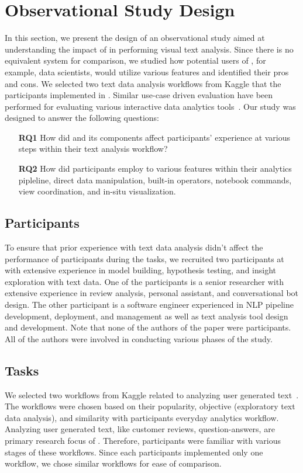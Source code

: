 \section{Observational Study Design}
\label{sec:study}
In this section, we present the design of an observational study
aimed at understanding the impact of \system in performing visual text analysis. 
Since there is no equivalent system for comparison, 
we studied how potential users of \system, for example, data scientists, would utilize various features and identified their pros and cons. 
We selected two text data analysis workflows 
from Kaggle that the participants implemented in
\system. Similar use-case driven evaluation have been performed for 
evaluating various interactive data analytics tools~\cite{fisher2012trust,moritz2017trust}. 
Our study was designed to answer the following questions:
\begin{itemize}
    \item[\textbf{RQ1}] How did \system and its components affect participants' experience at various steps within their text analysis workflow?
    \item[\textbf{RQ2}] How did participants employ to various \system features within their analytics pipleline, \eg direct data manipulation, built-in operators, notebook commands, view coordination, and in-situ visualization. 
\end{itemize}

\subsection{Participants}
\label{sec:participants}
To ensure that prior experience with text data analysis 
didn't affect the performance of participants during the tasks, 
we recruited two participants at \company with extensive experience in model building, hypothesis testing, and insight exploration with text data. One of the participants is a senior researcher with extensive experience in review analysis, personal assistant, and conversational bot design. The other participant is a software engineer
experienced in NLP pipeline development, deployment, and management
as well as text analysis tool design and development. 
Note that none of the authors of the paper were participants.
All of the authors were involved in conducting various phases of the study.

\subsection{Tasks}
\label{sec:tasks}
We selected two workflows from Kaggle related to analyzing user generated text~\cite{tweet, spam}. The workflows were chosen based on their popularity, objective (exploratory text data analysis), and similarity with participants everyday analytics workflow. Analyzing user generated text, like customer reviews, question-answers, are primary research focus of \company. Therefore, participants were familiar with various stages of these workflows. Since each participants implemented only one workflow, we chose similar workflows for ease of comparison. 

